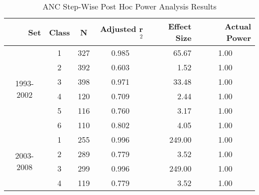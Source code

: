 \begin{table}\tiny
  \centering
	\caption{ANC Step-Wise Post Hoc Power Analysis Results}
    \begin{tabular}{rrcrrr}
    \toprule
    Set   & Class & N     & Adjusted r$^2$ & \multicolumn{1}{p{.5cm}}{Effect Size} & Actual Power \\
    \midrule
    \multicolumn{1}{c}{\multirow{6}[1]{*}{\begin{sideways}1993-2002\end{sideways}}} & \multicolumn{1}{c}{1} & \multicolumn{1}{c}{327} & \multicolumn{1}{c}{0.985 } & \multicolumn{1}{r}{65.67 } & \multicolumn{1}{c}{1.00 } \\
    \multicolumn{1}{c}{} & \multicolumn{1}{c}{2} & \multicolumn{1}{c}{392} & \multicolumn{1}{c}{0.603 } & \multicolumn{1}{r}{1.52 } & \multicolumn{1}{c}{1.00 } \\
    \multicolumn{1}{c}{} & \multicolumn{1}{c}{3} & \multicolumn{1}{c}{398} & \multicolumn{1}{c}{0.971 } & \multicolumn{1}{r}{33.48 } & \multicolumn{1}{c}{1.00 } \\
    \multicolumn{1}{c}{} & \multicolumn{1}{c}{4} & \multicolumn{1}{c}{120} & \multicolumn{1}{c}{0.709 } & \multicolumn{1}{r}{2.44 } & \multicolumn{1}{c}{1.00 } \\
    \multicolumn{1}{c}{} & \multicolumn{1}{c}{5} & \multicolumn{1}{c}{116} & \multicolumn{1}{c}{0.760 } & \multicolumn{1}{r}{3.17 } & \multicolumn{1}{c}{1.00 } \\
    \multicolumn{1}{c}{} & \multicolumn{1}{c}{6} & \multicolumn{1}{c}{110} & \multicolumn{1}{c}{0.802} & \multicolumn{1}{r}{4.05 } & \multicolumn{1}{c}{1.00 } \\\midrule
    \multicolumn{1}{c}{\multirow{6}[2]{*}{\begin{sideways}2003-2008\end{sideways}}} & \multicolumn{1}{c}{1} & \multicolumn{1}{c}{255} & \multicolumn{1}{c}{0.996 } & \multicolumn{1}{r}{249.00 } & \multicolumn{1}{c}{1.00 } \\
    \multicolumn{1}{c}{} & \multicolumn{1}{c}{2} & \multicolumn{1}{c}{289} & \multicolumn{1}{c}{0.779 } & \multicolumn{1}{r}{3.52 } & \multicolumn{1}{c}{1.00 } \\
    \multicolumn{1}{c}{} & \multicolumn{1}{c}{3} & \multicolumn{1}{c}{299} & \multicolumn{1}{c}{0.996 } & \multicolumn{1}{r}{249.00 } & \multicolumn{1}{c}{1.00 } \\
    \multicolumn{1}{c}{} & \multicolumn{1}{c}{4} & \multicolumn{1}{c}{119} & \multicolumn{1}{c}{0.779 } & \multicolumn{1}{r}{3.52 } & \multicolumn{1}{c}{1.00 } \\

\end{tabular}
\end{table}
